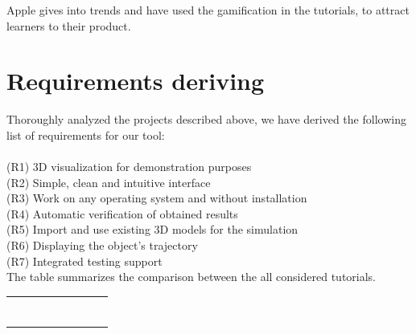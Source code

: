 Apple gives into trends and have used the gamification in the tutorials, to attract learners to their product.

\section{Requirements deriving}
Thoroughly analyzed the projects described above, we have derived the following list of requirements for our tool: \\\\
(R1) 3D visualization for demonstration purposes \\
(R2) Simple, clean and intuitive interface \\
(R3) Work on any operating system and without installation \\
(R4) Automatic verification of obtained results \\
(R5) Import and use existing 3D models for the simulation \\
(R6) Displaying the object's trajectory \\
(R7) Integrated testing support \\

The table summarizes the comparison between the all considered tutorials.
\begin{table}[h!]
    \begin{tabular}{|l|l|l|l|l|l|l|l|l|}
    \hline
     &  &  &  &  &  &  &  &  \\ \hline
     &  &  &  &  &  &  &  &  \\ \hline
     &  &  &  &  &  &  &  &  \\ \hline
     &  &  &  &  &  &  &  &  \\ \hline
     &  &  &  &  &  &  &  &  \\ \hline
     &  &  &  &  &  &  &  &  \\ \hline
     &  &  &  &  &  &  &  &  \\ \hline
     &  &  &  &  &  &  &  &  \\ \hline
    \end{tabular}
    \end{table}

\cleardoublepage